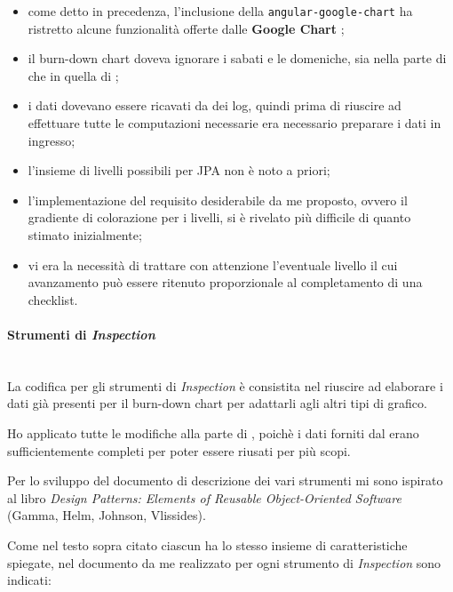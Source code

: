 \begin{itemize}
\item come detto in precedenza, l'inclusione della 
  \texttt{angular-google-chart} ha ristretto alcune funzionalità offerte dalle
  \textbf{Google Chart };
\item il burn-down chart doveva ignorare i sabati e le domeniche, sia nella
  parte di \BKEND{} che in quella di \FREND{};
\item i dati dovevano essere ricavati da dei log, quindi prima di riuscire ad
  effettuare tutte le computazioni necessarie era necessario preparare i dati
  in ingresso;
\item l'insieme di livelli possibili per JPA non è noto a priori;
\item l'implementazione del requisito desiderabile da me proposto, ovvero il
  gradiente di colorazione per i livelli, si è rivelato più difficile di
  quanto stimato inizialmente;
\item vi era la necessità di trattare con attenzione l'eventuale livello il
  cui avanzamento può essere ritenuto proporzionale al completamento di una
  checklist.
\end{itemize}

\paragraph{Strumenti di \emph{Inspection}} \mbox{} \\

La codifica per gli strumenti di \emph{Inspection} è consistita nel riuscire
ad elaborare i dati già presenti per il burn-down chart per adattarli agli
altri tipi di grafico.

Ho applicato tutte le modifiche alla parte di \FREND{}, poichè i dati
forniti dal \BKEND{} erano sufficientemente completi per poter essere riusati
per più scopi.

Per lo sviluppo del documento di descrizione dei vari strumenti mi sono
ispirato al libro \emph{Design Patterns: Elements of Reusable Object-Oriented
Software} (Gamma, Helm, Johnson, Vlissides).

Come nel testo sopra citato ciascun  ha lo stesso
insieme di caratteristiche spiegate, nel documento da me realizzato per ogni
strumento di \emph{Inspection} sono indicati:

